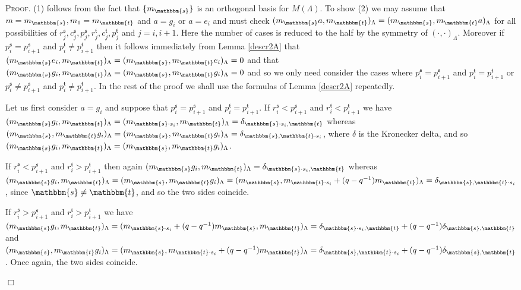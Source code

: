 \documentclass[10pt,a4,twoside,hidelinks,rm]{article}
\newcommand\es{\mathbbm{s}}
\newcommand\et{\mathbbm{t}}
\newcommand{\bT}{\pmb{\mathfrak{t}}}
\newcommand{\Bs}{\pmb{\mathfrak{s}}}
\theoremstyle{plain}
\newenvironment{demo}
{\textsc{Proof.}} {\quad \hfill $\Box$}
\begin{document}
\begin{demo}
  (1) follows from the fact that $\{ m_{\es} \} $ is an orthogonal basis for $ M(\Lambda) $. To show (2) we may assume that $ m= m_{\es}, m_1 = m_{\et}   $ and $ a = g_i$ or $ a = e_i$
  and must check $ ( m_{\es} a,  m_{\et})_{\Lambda} = ( m_{\es} , m_{\et }a )_{\Lambda} $ for all
  possibilities of $ r_j^{\Bs}, c_j^{\Bs}, p_j^{\Bs}, r_j^{\bT}, c_j^{\bT}, p_j^{\bT} $ and $ j = i, i+1$.
Here the number of cases is reduced to the half by the symmetry of $ (\cdot, \cdot)_{\Lambda} $.
Moreover if $ p_i^{\Bs} = p_{i+1}^{\Bs} $ and
$ p_i^{\bT} \neq p_{i+1}^{\bT} $ then it follows immediately from Lemma \ref{descr2A} that
$  (m_{\es}e_i , m_{\et})_{\Lambda} = (m_{\es} , m_{\et} e_i)_{\Lambda} =0$ and that
$  (m_{\es}g_i , m_{\et})_{\Lambda} = (m_{\es} , m_{\et} g_i)_{\Lambda} =0$
and so we only need
consider the cases where 
$ p_i^{\Bs} = p_{i+1}^{\Bs} $ and $ p_i^{\bT} = p_{i+1}^{\bT} $ or 
$ p_i^{\Bs} \neq p_{i+1}^{\Bs} $ and $ p_i^{\bT} \neq  p_{i+1}^{\bT} $. 
In the rest of the proof we shall use the formulas of Lemma \ref{descr2A} repeatedly.

Let us first consider $ a = g_i $ and 
suppose that 
$ p_i^{\Bs} = p_{i+1}^{\Bs} $ and $ p_i^{\bT} = p_{i+1}^{\bT} $. 
If $ r_i^{\Bs} < p_{i+1}^{\Bs} $ and $ r_i^{\bT} < p_{i+1}^{\bT} $ 
we have $ (m_{\es} g_i, m_{\et})_{\Lambda}
  = (m_{\es \cdot s_i}, m_{\et })_{\Lambda} = \delta_{ \es \cdot s_i , \et} $ whereas
  $ (m_{\es}  , m_{\et} g_i)_{\Lambda}
  = (m_{\es},  m_{\et} g_i  )_{\Lambda} = \delta_{ \es ,\et \cdot s_i } $, where $ \delta$ is the Kronecker delta, 
and so $ (m_{\es} g_i, m_{\et})_{\Lambda} = (m_{\es},  m_{\et} g_i  )_{\Lambda} $.

If $ r_i^{\Bs} < p_{i+1}^{\Bs} $ and $ r_i^{\bT} > p_{i+1}^{\bT} $
then again
$ (m_{\es} g_i, m_{\et})_{\Lambda}
 = \delta_{ \es \cdot s_i , \et} $
whereas $ (  m_{\es} g_i, m_{\et}           )_{\Lambda} = ( m_{\es},  m_{\et}   g_i)_{\Lambda} = 
(m_{\es }, m_{\et \cdot s_i} + (q-q^{-1})m_{\et  })_{\Lambda}
= \delta_{ \es  ,  \et \cdot s_i   }    $, since $ \es \neq \et $, and so 
the two sides coincide.

If $ r_i^{\Bs} > p_{i+1}^{\Bs} $ and $ r_i^{\bT} > p_{i+1}^{\bT} $
we have 
$ (m_{\es} g_i , m_{\et} )_{\Lambda} =
(m_{\es \cdot s_i } + (q-q^{-1})m_{\es }, m_{\et})_{\Lambda} = \delta_{\es \cdot s_i, \et } + (q-q^{-1}) \delta_{\es, \et}$
and $ (m_{\es} , m_{\et} g_i)_{\Lambda} = 
(m_{\es }, m_{\et \cdot s_i} + (q-q^{-1})m_{\et  })_{\Lambda}
= \delta_{ \es  , \et \cdot s_i} + (q-q^{-1}) \delta_{\es, \et}   $. Once again, the two sides coincide.


\end{demo}
\end{document}
